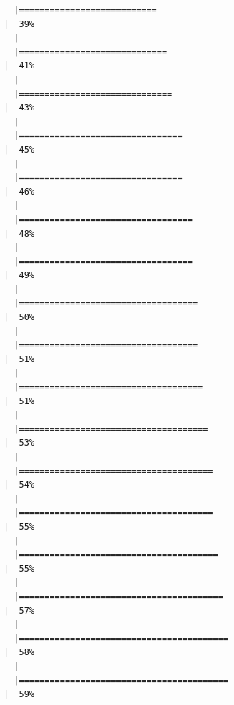 \documentclass[
  letterpaper,
  DIV=11,
  numbers=noendperiod]{scrreprt}
\begin{document}
\begin{verbatim}
  |===========================                                           |  39%
  |                                                                            
  |=============================                                         |  41%
  |                                                                            
  |==============================                                        |  43%
  |                                                                            
  |================================                                      |  45%
  |                                                                            
  |================================                                      |  46%
  |                                                                            
  |==================================                                    |  48%
  |                                                                            
  |==================================                                    |  49%
  |                                                                            
  |===================================                                   |  50%
  |                                                                            
  |===================================                                   |  51%
  |                                                                            
  |====================================                                  |  51%
  |                                                                            
  |=====================================                                 |  53%
  |                                                                            
  |======================================                                |  54%
  |                                                                            
  |======================================                                |  55%
  |                                                                            
  |=======================================                               |  55%
  |                                                                            
  |========================================                              |  57%
  |                                                                            
  |=========================================                             |  58%
  |                                                                            
  |=========================================                             |  59%

\end{verbatim}
\end{document}
